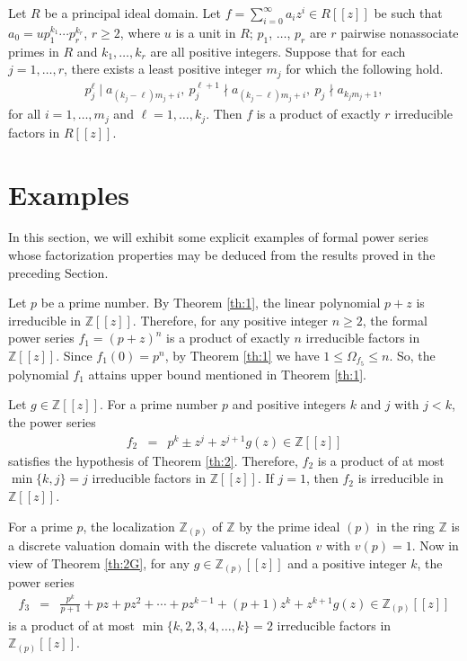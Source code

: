 \documentclass[12pt,reqno]{amsart}%
\begin{document}
\begin{theorem}\label{th:9}
    Let $R$ be a principal ideal domain. Let $f=\sum_{i=0}^\infty a_i z^i \in R[[z]]$ be such that $a_0=up_1^{k_1}\cdots p_r^{k_r}$, $r\geq 2$, where $u$ is a unit in $R$; $p_1$, $\ldots$, $p_r$ are $r$ pairwise nonassociate primes in $R$ and $k_1,\ldots,k_r$ are all positive integers. Suppose that for each $j=1,\ldots,r$, there exists a least positive integer  $m_j$ for which the following hold.
\begin{eqnarray*}
p_j^{\ell}\mid a_{(k_j-\ell)m_j+i},~p_j^{\ell+1}\nmid a_{(k_j-\ell)m_j+i},~p_j\nmid a_{k_jm_j+1},
\end{eqnarray*}
for all $i=1,\ldots, m_j$ and $\ell=1,\ldots, k_j$. Then   $f$ is a product of exactly $r$ irreducible factors in $R[[z]]$.
\end{theorem}
\section{Examples}\label{sec:4}
In this section, we will exhibit some explicit examples of formal power series whose factorization properties may be deduced from the results proved in the preceding Section.
\begin{example}Let $p$ be a prime number. By Theorem \ref{th:1}, the linear polynomial $p+z$ is irreducible in $\mathbb{Z}[[z]]$.  Therefore, for any positive integer $n\geq 2$, the formal power series
$f_1=(p+z)^n$ is a product of exactly $n$ irreducible factors in $\mathbb{Z}[[z]]$. Since $f_1(0)=p^n$, by Theorem \ref{th:1}  we have $1\leq \Omega_{f_5}\leq n$. So, the polynomial $f_1$ attains upper bound mentioned in Theorem \ref{th:1}.
\end{example}
\begin{example}Let $g\in \mathbb{Z}[[z]]$. For a prime number $p$ and positive integers $k$ and $j$ with $j<k$, the  power series
 \begin{eqnarray*}
 f_2   &=& p^k\pm z^j+z^{j+1}g(z) \in \mathbb{Z}[[z]]
 \end{eqnarray*}
satisfies the hypothesis of Theorem \ref{th:2}. Therefore, $f_2$ is a product of at most $\min\{k,j\}=j$ irreducible factors in $\mathbb{Z}[[z]]$. If $j=1$, then $f_2$ is irreducible in $\mathbb{Z}[[z]]$.
\end{example}
\begin{example} For a prime $p$, the localization $\mathbb{Z}_{(p)}$ of $\mathbb{Z}$ by the prime ideal $(p)$ in the ring $\mathbb{Z}$ is a discrete valuation domain with the discrete valuation $v$ with $v(p)=1$. Now in view of Theorem \ref{th:2G}, for any $g\in \mathbb{Z}_{(p)}[[z]]$ and a positive integer $k$, the power series
    \begin{eqnarray*}
f_3 &=& \frac{p^k}{p+1}+pz+pz^2+\cdots +pz^{k-1}+(p+1)z^k +z^{k+1}g(z)\in \mathbb{Z}_{(p)}[[z]]
\end{eqnarray*}
is a  product of at most $\min \{k,2,3,4,\ldots,k\}=2$ irreducible factors in $\mathbb{Z}_{(p)}[[z]]$.
\end{example}
\end{document}
